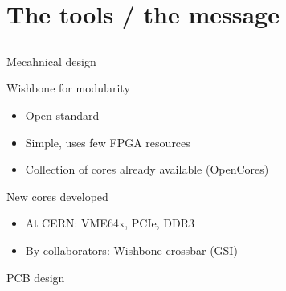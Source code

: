 \documentclass[compress,red]{beamer}
\begin{document}
\section{The tools / the message}

\subsection*{} %

\begin{frame}{Mecahnical design}

  \begin{block}{Wishbone for modularity}
    \begin{itemize}
    \item Open standard
    \item Simple, uses few FPGA resources
    \item Collection of cores already available (OpenCores)
    \end{itemize}
  \end{block}

  \begin{block}{New cores developed}
    \begin{itemize}
    \item At CERN: VME64x, PCIe, DDR3
    \item By collaborators: Wishbone crossbar (GSI)
    \end{itemize}
  \end{block}

  \note[item]{}

\end{frame}

\begin{frame}{PCB design}

  \begin{center}
  \end{center}

  \note[item]{}

\end{frame}
\end{document}
